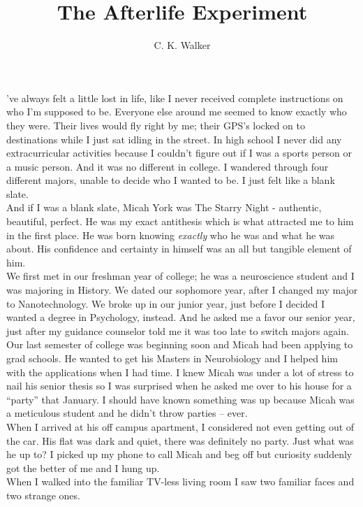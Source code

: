 \documentclass[a5paper]{scrartcl}
\title{The Afterlife Experiment}
\author{C. K. Walker}
\begin{document}
\maketitle

've always felt a little lost in life, like I never received complete instructions on who I'm supposed to be. Everyone else around me seemed to know exactly who they were. Their lives would fly right by me; their GPS's locked on to destinations while I just sat idling in the street. In high school I never did any extracurricular activities because I couldn't figure out if I was a sports person or a music person. And it was no different in college. I wandered through four different majors, unable to decide who I wanted to be. I just felt like a blank slate.\\
And if I was a blank slate, Micah York was The Starry Night - authentic, beautiful, perfect. He was my exact antithesis which is what attracted me to him in the first place. He was born knowing \textit{exactly} who he was and what he was about. His confidence and certainty in himself was an all but tangible element of him.\\
We first met in our freshman year of college; he was a neuroscience student and I was majoring in History. We dated our sophomore year, after I changed my major to Nanotechnology. We broke up in our junior year, just before I decided I wanted a degree in Psychology, instead. And he asked me a favor our senior year, just after my guidance counselor told me it was too late to switch majors again.\\
Our last semester of college was beginning soon and Micah had been applying to grad schools. He wanted to get his Masters in Neurobiology and I helped him with the applications when I had time. I knew Micah was under a lot of stress to nail his senior thesis so I was surprised when he asked me over to his house for a “party” that January. I should have known something was up because Micah was a meticulous student and he didn't throw parties – ever.\\
When I arrived at his off campus apartment, I considered not even getting out of the car. His flat was dark and quiet, there was definitely no party. Just what was he up to? I picked up my phone to call Micah and beg off but curiosity suddenly got the better of me and I hung up.\\
When I walked into the familiar TV-less living room I saw two familiar faces and two strange ones.\\
\end{document}
